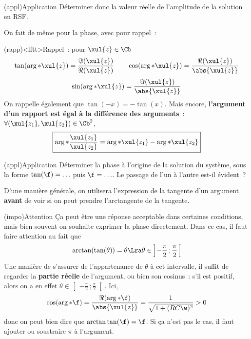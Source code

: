 \documentclass[../../main/main.tex]{subfiles}
\begin{document}
\begin{tcb}(appl){Application}
	Déterminer donc la valeur réelle de l'amplitude de la solution en RSF.
	\tcblower
\end{tcb}
On fait de même pour la phase, avec pour rappel~:
\begin{tcb}[sidebyside](rapp)<lftt>{Rappel~: pour $\xul{z} \in \Cb$}
	\[\tan(\arg*{\xul{z}}) = \frac{\Im(\xul{z})}{\Re(\xul{z})}
		\qquad
		\cos(\arg*{\xul{z}}) = \frac{\Re(\xul{z})}{\abs{\xul{z}}}
	\]
	\[
		\qquad
		\sin(\arg*{\xul{z}}) = \frac{\Im(\xul{z})}{\abs{\xul{z}}}
		\qquad
	\]
	On rappelle également que $\tan(-x) = -\tan(x)$.
	\tcblower
	Mais encore,
	\textbf{l'argument d'un rapport est égal à la différence des arguments}~:
	$\forall (\xul{z_1}, \xul{z_2}) \in \Cb^2$,
	\[
		\boxed{
			\arg*{ \frac{\xul{z_1}}{\xul{z_2}} } =
			\arg*{\xul{z_1}} - \arg*{\xul{z_2}}
		}
	\]
\end{tcb}
\begin{tcb}(appl){Application}
	Déterminer la phase à l'origine de la solution du système, sous la forme
	$\tan(\f) = \ldots$ puis $\f = \ldots$. Le passage de l'un à l'autre est-il
	évident~?
	\tcblower
\end{tcb}
D'une manière générale, on utilisera l'expression de la tangente d'un
argument \textbf{avant} de voir si on peut prendre l'arctangente de la
tangente.
\begin{tcb}(impo){Attention}
	Ça peut être une réponse acceptable dans certaines conditions, mais bien souvent
	on souhaite exprimer la phase directement. Dans ce cas, il faut faire attention
	au fait que
	\[
	\arctan(\tan(\theta)) = \theta
	\Lra
	\theta \in \left] - \frac{\pi}{2}\,; \frac{\pi}{2} \right[
		\]
		Une manière de s'assurer de l'appartenance de $\theta$ à cet intervalle, il
		suffit de regarder la \textbf{partie réelle} de l'argument, ou bien son
		cosinus~: s'il est positif, alors on a en effet $\theta \in \left] -
	\frac{\pi}{2}\,; \frac{\pi}{2} \right[$. Ici,
		\begin{gather*}
			\cos(\arg*{\f})
			= \frac{\Re(\arg*{\f})}{\abs{\xul{z}}}
			= \frac{1}{\sqrt{1 + (RC\w)^2}} > 0
		\end{gather*}
		donc on peut bien dire que $\arctan\tan(\f) = \f$.
		\smallbreak
		Si ça n'est pas le cas, il faut ajouter ou soustraire $\pi$ à l'argument.
\end{tcb}
\end{document}
